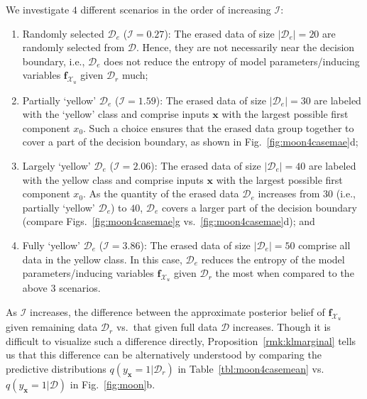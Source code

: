 \documentclass{article}
\theoremstyle{definition}
\newcommand{\mbf}[1]{\mathbf{#1}}
\newcommand{\mcl}[1]{\mathcal{#1}}
\newcommand{\da}{\mcl{D}}
\newcommand{\dc}{\mcl{D}_r}
\newcommand{\dr}{\mcl{D}_e}
\begin{document}
We investigate $4$ different scenarios in the order of increasing $\mcl{I}$:
%
\begin{enumerate}
    \item Randomly selected $\dr$ ($\mcl{I} = 0.27$): The erased data of size $|\dr|=20$ are randomly selected from $\da$. Hence, they are not necessarily near the decision boundary, i.e., $\dr$ does not reduce the entropy of  model parameters/inducing variables $\mbf{f}_{\mcl{X}_u}$ given $\dc$ much;
    \item Partially `yellow' $\dr$ ($\mcl{I} = 1.59$): The erased data of size $|\dr|=30$ are labeled with the `yellow' class and comprise inputs $\mbf{x}$ with the largest possible first component $x_0$. Such a choice ensures that the erased data group together to cover a part of the decision boundary, as shown in Fig.~\ref{fig:moon4casemae}d;
    \item Largely `yellow' $\dr$ ($\mcl{I} = 2.06$): The erased data of size $|\dr|=40$ are labeled with the yellow class and comprise inputs $\mbf{x}$ with the largest possible first component $x_0$. As the quantity of the erased data $\dr$ increases from $30$ (i.e., partially `yellow' $\dr$) to $40$, $\dr$ covers a larger part of the decision boundary (compare Figs.~\ref{fig:moon4casemae}g vs.~\ref{fig:moon4casemae}d); and
    \item Fully `yellow' $\dr$ ($\mcl{I} = 3.86$): The erased data of size $|\dr| = 50$ comprise all data in the yellow class. In this case, $\dr$ reduces the entropy of the model parameters/inducing variables $\mbf{f}_{\mcl{X}_u}$ given $\dc$ the most when compared to the above $3$ scenarios.
\end{enumerate}
%
As $\mcl{I}$ increases, the difference between the approximate posterior belief of $\mbf{f}_{\mcl{X}_u}$ given remaining data $\dc$ vs.~that given full data $\da$ increases. Though it is difficult to visualize such a difference directly, Proposition~\ref{rmk:klmarginal} tells us that this difference can be alternatively understood by comparing the predictive distributions $q(y_{\mbf{x}}=1| \dc)$ in Table~\ref{tbl:moon4casemean} vs.~$q(y_{\mbf{x}}=1|\da)$ in Fig.~\ref{fig:moon}b.
\end{document}
